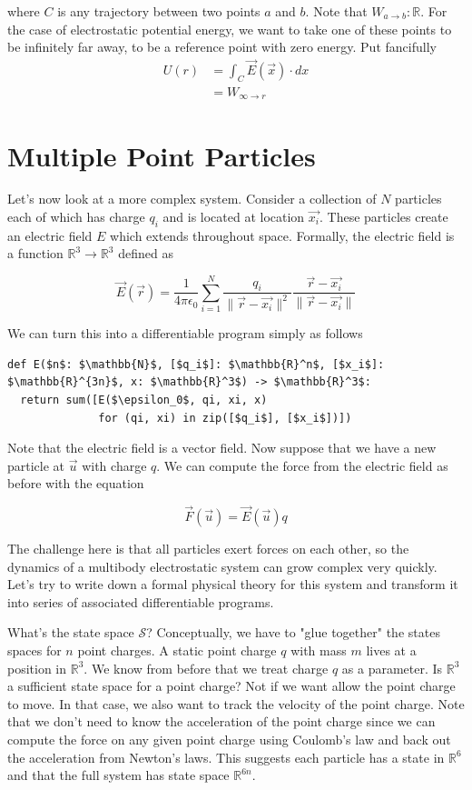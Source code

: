\documentclass[book.tex]{subfiles}
\begin{document}
where $C$ is any trajectory between two points $a$ and $b$. Note that $W_{a\to b}: \mathbb{R}$. For the case of electrostatic potential energy, we want to take one of these points to be infinitely far away, to be a reference point with zero energy. Put fancifully
\begin{align}
    U(r) &= \int_C \vec{E}(\vec{x}) \cdot dx \\
    &= W_{\infty \to r} 
\end{align}


\section{Multiple Point Particles}

Let's now look at a more complex system. Consider a collection of $N$ particles each of which has charge $q_i$ and is located at location $\vec{x_i}$. These particles create an electric field $E$ which extends throughout space. Formally, the electric field is a function $\mathbb{R}^3 \to \mathbb{R}^3$ defined as 

\[\vec{E}(\vec{r}) = \frac{1}{4 \pi \epsilon_0} \sum_{i=1}^N \frac{q_i}{\|\vec{r} - \vec{x_i}\|^2}  \frac{\vec{r}-\vec{x_i}}{\|\vec{r} - \vec{x_i}\|} \]

We can turn this into a differentiable program simply as follows

\begin{lstlisting}
def E($n$: $\mathbb{N}$, [$q_i$]: $\mathbb{R}^n$, [$x_i$]: $\mathbb{R}^{3n}$, x: $\mathbb{R}^3$) -> $\mathbb{R}^3$:
  return sum([E($\epsilon_0$, qi, xi, x) 
              for (qi, xi) in zip([$q_i$], [$x_i$])])
\end{lstlisting}


Note that the electric field is a vector field. Now suppose that we have a new particle at $\vec{u}$ with charge $q$. We can compute the force from the electric field as before with the equation 

\[\vec{F}(\vec{u}) = \vec{E}(\vec{u}) q \]

The challenge here is that all particles exert forces on each other, so the dynamics of a multibody electrostatic system can grow complex very quickly. Let's try to write down a formal physical theory for this system and transform it into series of associated differentiable programs. 

What's the state space $\mathcal{S}$? Conceptually, we have to "glue together" the states spaces for $n$ point charges. A static point charge $q$ with mass $m$ lives at a position in $\mathbb{R}^3$. We know from before that we treat charge $q$ as a parameter. Is $\mathbb{R}^3$ a sufficient state space for a point charge? Not if we want allow the point charge to move. In that case, we also want to track the velocity of the point charge. Note that we don't need to know the acceleration of the point charge since we can compute the force on any given point charge using Coulomb's law and back out the acceleration from Newton's laws. This suggests each particle has a state in $\mathbb{R}^6$ and that the full system has state space $\mathbb{R}^{6n}$.
\end{document}
